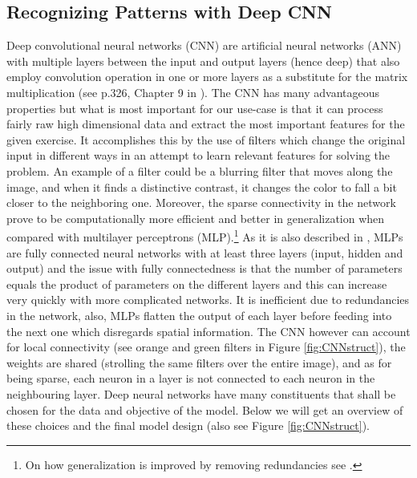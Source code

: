 \documentclass[11pt, a4paper]{article}
\begin{document}
\subsection{Recognizing Patterns with Deep CNN}
\label{subsec:DM:RecPatwCNN}
Deep convolutional neural networks (CNN) are artificial neural networks (ANN) with multiple layers between the input and output layers (hence deep) that also employ convolution operation in one or more layers as a substitute for the matrix multiplication (see p.326, Chapter 9 in \cite{goodfellow2016deep}). 
The CNN has many advantageous properties but what is most important for our use-case is that it can process fairly raw high dimensional data and extract the most important features for the given exercise. It accomplishes this by the use of filters which change the original input in different ways in an attempt to learn relevant features for solving the problem. An example of a filter could be a blurring filter that moves along the image, and when it finds a distinctive contrast, it changes the color to fall a bit closer to the neighboring one. Moreover, the sparse connectivity in the network prove to be computationally more efficient and better in generalization when compared with multilayer perceptrons (MLP).\footnote{On how generalization is improved by removing redundancies see \cite{chakraborty1999effect}.} As it is also described in \cite{MLPmedium}, MLPs are fully connected neural networks with at least three layers (input, hidden and output) and the issue with fully connectedness is that the number of parameters equals the product of parameters on the different layers and this can increase very quickly with more complicated networks. It is inefficient due to redundancies in the network, also, MLPs flatten the output of each layer before feeding into the next one which disregards spatial information. The CNN however can account for local connectivity (see orange and green filters in Figure \ref{fig:CNNstruct}), the weights are shared (strolling the same filters over the entire image), and as for being sparse, each neuron in a layer is not connected to each neuron in the neighbouring layer. Deep neural networks have many constituents that shall be chosen for the data and objective of the model. Below we will get an overview of these choices and the final model design (also see Figure \ref{fig:CNNstruct}).
\end{document}

